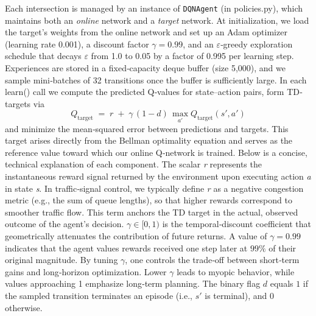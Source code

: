 \documentclass[conference]{IEEEtran}
\begin{document}
Each intersection is managed by an instance of {\tt DQNAgent} (in policies.py), which maintains both an \emph{online} network and a \emph{target} network. At initialization, we load the target’s weights from the online network and set up an Adam optimizer (learning rate 0.001), a discount factor $\gamma=0.99$, and an $\varepsilon$‐greedy exploration schedule that decays $\varepsilon$ from 1.0 to 0.05 by a factor of 0.995 per learning step. Experiences are stored in a fixed‐capacity deque buffer (size 5,000), and we sample mini‐batches of 32 transitions once the buffer is sufficiently large. In each learn() call we compute the predicted Q‐values for state–action pairs, form TD‐targets via 
\[
Q_{\mathrm{target}} \;=\; r \;+\; \gamma\,(1 - d)\,\max_{a'} Q_{\mathrm{target}}(s', a')
\]
and minimize the mean‐squared error between predictions and targets. This target arises directly from the Bellman optimality equation and serves as the reference value toward which our online Q‐network is trained. Below is a concise, technical explanation of each component. The scalar \textit{r} represents the instantaneous reward signal returned by the environment upon executing action \textit{a} in state \textit{s}. In traffic‐signal control, we typically define \textit{r} as a negative congestion metric (e.g., the sum of queue lengths), so that higher rewards correspond to smoother traffic flow. This term anchors the TD target in the actual, observed outcome of the agent’s decision. $\gamma \in [0,1)$ is the temporal‐discount coefficient that geometrically attenuates the contribution of future returns.  
A value of $\gamma = 0.99$ indicates that the agent values rewards received one step later at $99\%$ of their original magnitude.  
By tuning $\gamma$, one controls the trade‐off between short‐term gains and long‐horizon optimization. Lower $\gamma$ leads to myopic behavior, while values approaching 1 emphasize long‐term planning. The binary flag $d$ equals $1$ if the sampled transition terminates an episode (i.e., $s'$ is terminal), and $0$ otherwise.  
\end{document}
